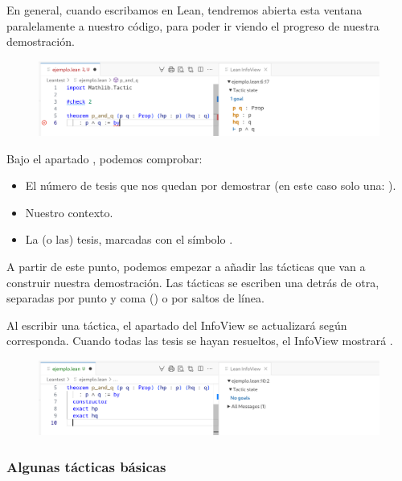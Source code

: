 En general, cuando escribamos en Lean, tendremos abierta esta ventana paralelamente a nuestro código, para poder ir viendo el progreso de nuestra demostración.

\begin{figure}[h]
  \centering
  \includegraphics[width=1\textwidth]{figuras/theorem-example-light-version.png}
\end{figure}

Bajo el apartado , podemos comprobar:

\begin{itemize}
  \item El número de tesis que nos quedan por demostrar (en este caso solo una: ).
  \item Nuestro contexto.
  \item La (o las) tesis, marcadas con el símbolo \bluecode{$\vdash$}.
\end{itemize}

A partir de este punto, podemos empezar a añadir las tácticas que van a construir nuestra demostración. Las tácticas se escriben una detrás de otra, separadas por punto y coma (\code{;}) o por saltos de línea.

Al escribir una táctica, el apartado  del InfoView se actualizará según corresponda. Cuando todas las tesis se hayan resueltos, el InfoView mostrará .

\begin{figure}[h]
  \centering
  \includegraphics[width=1\textwidth]{figuras/no-goals-example-light-version.png}
\end{figure}

\newpage

\subsubsection{Algunas tácticas básicas}

